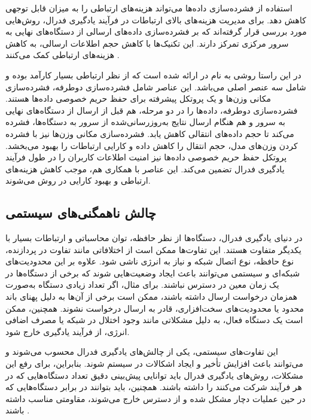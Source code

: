 استفاده از فشرده‌سازی داده‌ها می‌تواند هزینه‌های ارتباطی را به میزان قابل توجهی کاهش دهد. برای مدیریت هزینه‌های بالای ارتباطات در فرآیند یادگیری فدرال، روش‌هایی مورد بررسی قرار گرفته‌اند که بر فشرده‌سازی داده‌های ارسالی از دستگاه‌های نهایی به سرور مرکزی تمرکز دارند. این تکنیک‌ها با کاهش حجم اطلاعات ارسالی، به کاهش هزینه‌های ارتباطی کمک می‌کنند
\cite{konevcny2016federated}.

در این راستا روشی به نام
%
در
\cite{fang2021privacy}
ارائه شده است که از نظر ارتباطی بسیار کارآمد بوده و شامل سه عنصر اصلی می‌باشد. این عناصر شامل فشرده‌سازی دوطرفه، فشرده‌سازی مکانی وزن‌ها و یک پروتکل پیشرفته برای حفظ حریم خصوصی داده‌ها هستند. فشرده‌سازی دوطرفه، داده‌ها را در دو مرحله، هم قبل از ارسال از دستگاه‌های نهایی به سرور و هم هنگام ارسال نتایج به‌روزرسانی‌شده از سرور به دستگاه‌ها، فشرده می‌کند تا حجم داده‌های انتقالی کاهش یابد. فشرده‌سازی مکانی وزن‌ها نیز با فشرده کردن وزن‌های مدل، حجم انتقال را کاهش داده و کارایی ارتباطات را بهبود می‌بخشد. پروتکل حفظ حریم خصوصی داده‌ها نیز امنیت اطلاعات کاربران را در طول فرآیند یادگیری فدرال تضمین می‌کند. این عناصر با همکاری هم، موجب کاهش هزینه‌های ارتباطی و بهبود کارایی در روش
می‌شوند.



\subsection{
	چالش ناهمگنی‌های سیستمی%
}
در دنیای یادگیری فدرال، دستگاه‌ها از نظر حافظه، توان محاسباتی و ارتباطات بسیار با یکدیگر متفاوت هستند. این تفاوت‌ها ممکن است از اختلافاتی مانند تفاوت در پردازنده، نوع حافظه، نوع اتصال شبکه و نیاز به انرژی ناشی شود. علاوه بر این محدودیت‌های شبکه‌ای و سیستمی می‌توانند باعث ایجاد وضعیت‌هایی شوند که برخی از دستگاه‌ها در یک زمان معین در دسترس نباشند. برای مثال، اگر تعداد زیادی دستگاه به‌صورت همزمان درخواست ارسال داشته باشند، ممکن است برخی از آن‌ها به دلیل پهنای باند محدود یا محدودیت‌های سخت‌افزاری، قادر به ارسال درخواست نشوند. همچنین، ممکن است یک دستگاه فعال، به دلیل مشکلاتی مانند وجود اختلال در شبکه یا مصرف اضافی انرژی، از فرآیند یادگیری خارج شود.

این تفاوت‌های سیستمی، یکی از چالش‌های یادگیری فدرال محسوب می‌شوند و می‌توانند باعث افزایش تأخیر و ایجاد اشکالات در سیستم شوند. بنابراین، برای رفع این مشکلات، روش‌های یادگیری فدرال باید توانایی پیش‌بینی دقیق تعداد دستگاه‌هایی که در هر فرآیند شرکت می‌کنند را داشته باشند. همچنین، باید بتوانند در برابر دستگاه‌هایی که در حین عملیات دچار مشکل شده و از دسترس خارج می‌شوند، مقاومتی مناسب داشته باشند
\cite{li2020federated}.


